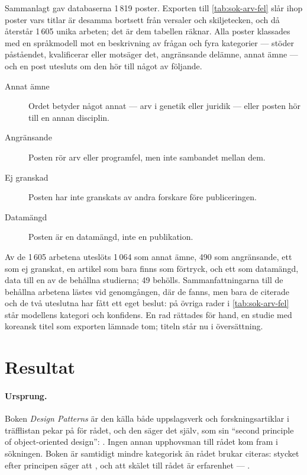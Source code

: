 Sammanlagt gav databaserna 1\,819 poster.  Exporten till
\cref{tab:sok-arv-fel} slår ihop poster vars titlar är desamma bortsett
från versaler och skiljetecken, och då återstår 1\,605 unika arbeten;
det är dem tabellen räknar.  Alla poster klassades med en språkmodell
mot en beskrivning av frågan och fyra kategorier --- stöder påståendet,
kvalificerar eller motsäger det, angränsande delämne, annat ämne --- och
en post utesluts om den hör till något av följande.
\begin{description}
  \item[Annat ämne] Ordet betyder något annat --- arv i genetik eller
    juridik --- eller posten hör till en annan disciplin.
  \item[Angränsande] Posten rör arv eller programfel, men inte sambandet
    mellan dem.
  \item[Ej granskad] Posten har inte granskats av andra forskare före
    publiceringen.
  \item[Datamängd] Posten är en datamängd, inte en publikation.
\end{description}
Av de 1\,605 arbetena uteslöts 1\,064 som annat ämne, 490 som
angränsande, ett som ej granskat, en artikel som bara finns som
förtryck, och ett som datamängd, data till en av de behållna
studierna; 49 behölls.  Sammanfattningarna till de behållna arbetena
lästes vid genomgången, där de fanns, men bara de citerade och de två
uteslutna har fått ett eget beslut: på övriga rader i
\cref{tab:sok-arv-fel} står modellens kategori och konfidens.  En rad
rättades för hand, en studie med koreansk titel som exporten lämnade tom; titeln står nu i översättning.

\section{Resultat}
\label{sec:komp-resultat}

\paragraph{Ursprung.}  Boken \emph{Design
Patterns}\autocite{Gamma1994DesignPatterns} är den källa både
uppslagsverk och forskningsartiklar i träfflistan pekar på för rådet,
och den säger det själv, som sin \enquote{second principle of
object-oriented design}: .  Ingen annan upphovsman till
rådet kom fram i sökningen.  Boken är samtidigt mindre kategorisk än
rådet brukar citeras: stycket efter principen säger att
, och att skälet till rådet är
erfarenhet --- .

